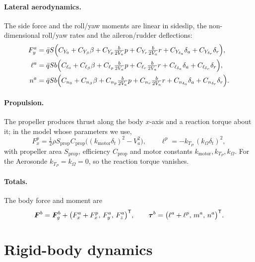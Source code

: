 \paragraph{Lateral aerodynamics.} The side force and the roll/yaw moments are
linear in sideslip, the non-dimensional roll/yaw rates and the aileron/rudder
deflections:
\begin{align}
F_y^{a}&=\bar qS\Bigl(C_{Y_0}+C_{Y_\beta}\beta+C_{Y_p}\tfrac{b}{2V_a}p
+C_{Y_r}\tfrac{b}{2V_a}r+C_{Y_{\delta_a}}\delta_a+C_{Y_{\delta_r}}\delta_r\Bigr),\label{eq:fw-fy}\\
\ell^{a}&=\bar qSb\Bigl(C_{\ell_0}+C_{\ell_\beta}\beta+C_{\ell_p}\tfrac{b}{2V_a}p
+C_{\ell_r}\tfrac{b}{2V_a}r+C_{\ell_{\delta_a}}\delta_a+C_{\ell_{\delta_r}}\delta_r\Bigr),\label{eq:fw-l}\\
n^{a}&=\bar qSb\Bigl(C_{n_0}+C_{n_\beta}\beta+C_{n_p}\tfrac{b}{2V_a}p
+C_{n_r}\tfrac{b}{2V_a}r+C_{n_{\delta_a}}\delta_a+C_{n_{\delta_r}}\delta_r\Bigr).\label{eq:fw-n}
\end{align}

\paragraph{Propulsion.} The propeller produces thrust along the body $x$-axis and
a reaction torque about it; in the model whose parameters we use,
\begin{equation}
F_x^{p}=\tfrac12\rho S_{\mathrm{prop}}C_{\mathrm{prop}}
\bigl((k_{\mathrm{motor}}\delta_t)^2-V_a^2\bigr),\qquad
\ell^{p}=-k_{T_P}\,(k_\Omega\delta_t)^2,
\label{eq:fw-prop}
\end{equation}
with propeller area $S_{\mathrm{prop}}$, efficiency $C_{\mathrm{prop}}$ and motor
constants $k_{\mathrm{motor}},k_{T_P},k_\Omega$. For the Aerosonde
$k_{T_P}=k_\Omega=0$, so the reaction torque vanishes.

\paragraph{Totals.} The body force and moment are
\begin{equation}
\bm{F}^{b}=\bm{F}_g^{b}+\bigl(F_x^{a}+F_x^{p},\,F_y^{a},\,F_z^{a}\bigr)^{\mathsf{T}},
\qquad
\bm{\tau}^{b}=\bigl(\ell^{a}+\ell^{p},\,m^{a},\,n^{a}\bigr)^{\mathsf{T}}.
\label{eq:fw-totals}
\end{equation}

\section{Rigid-body dynamics}

